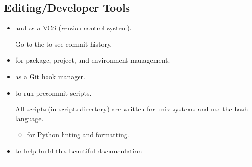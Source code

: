 \documentclass[letterpaper,10pt,english]{sphinxmanual}
\begin{document}
\subsection{Editing/Developer Tools}
\label{\detokenize{design/project-plan:editing-developer-tools}}\begin{itemize}
\item {} 
\sphinxAtStartPar
{} and  as a VCS (version control system). %
\begin{footnote}[1]\sphinxAtStartFootnote
Go to the  to see commit history.
%
\end{footnote}

\item {} 
\sphinxAtStartPar
{} for package, project, and environment management.

\item {} 
\sphinxAtStartPar
{} as a Git hook manager.

\item {} 
\sphinxAtStartPar
{} to run pre\sphinxhyphen{}commit scripts. %
\begin{footnote}[2]\sphinxAtStartFootnote
All scripts (in scripts directory) are written for unix systems and use the bash language.
%
\end{footnote}
\begin{itemize}
\item {} 
\sphinxAtStartPar
{} for Python linting and formatting.

\end{itemize}

\item {} 
\sphinxAtStartPar
{} to help build this beautiful documentation.

\end{itemize}


\bigskip\hrule\bigskip


\sphinxstepscope
\end{document}
